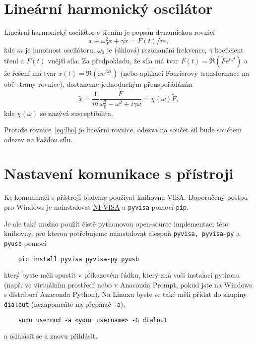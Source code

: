 \newpage
\section{Lineární harmonický oscilátor}
\label{sec:lho}
Lineární harmonický oscilátor s třením je popsán dynamickou rovnicí
\begin{equation}
    \label{eq:lho}
    \ddot x + \omega_0^2 x + \gamma\dot x = F(t)/m,
\end{equation}
kde $m$ je hmotnost oscilátoru, $\omega_0$ je (úhlová) rezonanční frekvence, $\gamma$ koeficient tření a $F(t)$ vnější síla. Za předpokladu, že síla má tvar $F(t) = \Re(\tilde F e^{i\omega t})$ a že řešení má tvar $x(t) = \Re(\tilde x e^{i\omega t})$ (nebo aplikací Fourierovy transformace na obě strany rovnice), dostaneme jednoduchým přeuspořádáním
\begin{equation}
    \tilde x = \frac{1}{m}\frac{\tilde F}{\omega_0^2 - \omega^2 + i\gamma\omega} = \chi(\omega)\tilde F,
\end{equation}
kde $\chi(\omega)$ se nazývá susceptibilita.

Protože rovnice~\ref{eq:lho} je lineární rovnice, odezva na součet sil bude součtem odezev na každou sílu.

\section{Nastavení komunikace s přístroji}
\label{sec:pico}
Ke komunikaci s přístroji budeme používat knihovnu VISA. Doporučený postpu pro Windows je nainstalovat \href{https://www.ni.com/en/support/downloads/drivers/download/packaged.ni-visa.570633.html}{NI-VISA} a \verb|pyvisa| pomocí \verb|pip|.

Je ale také možno použít čistě pythonovou open-source implementaci této knihovny, pro kterou potřebujeme nainstalovat alespoň \verb|pyvisa, pyvisa-py| a \verb|pyusb| pomocí
\begin{verbatim}
    pip install pyvisa pyvisa-py pyusb
\end{verbatim}
který byste měli spustit v příkazovém řádku, který zná vaši instalaci pythonu (např. ve virtuálním prostředí nebo v Anaconda Prompt, pokud jste na Windows s distribucí Anaconda Python). Na Linuxu byste se také měli přidat do skupiny \verb|dialout| (nezapomeňte na přepínač \verb|-a|),
\begin{verbatim}
    sudo usermod -a <your username> -G dialout 
\end{verbatim}
a odhlásit se a znovu přihlásit.

